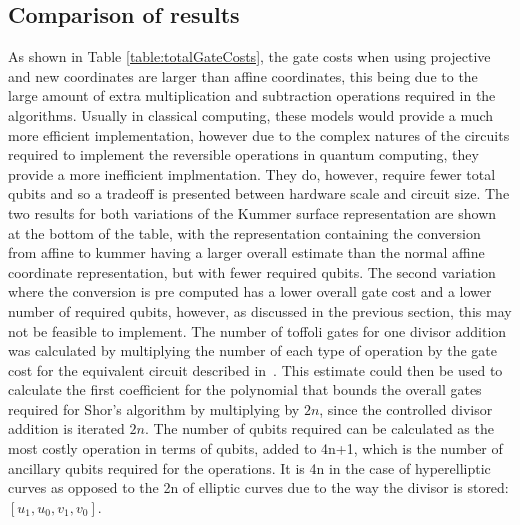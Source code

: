 \subsection{Comparison of results}
As shown in Table \ref{table:totalGateCosts}, the gate costs when using projective and new coordinates are larger than affine coordinates, this being due to the large amount of extra multiplication and subtraction operations required in the algorithms. Usually in classical computing, these models would provide a much more efficient implementation, however due to the complex natures of the circuits required to implement the reversible operations in quantum computing, they provide a more inefficient implmentation. They do, however, require fewer total qubits and so a tradeoff is presented between hardware scale and circuit size. The two results for both variations of the Kummer surface representation are shown at the bottom of the table, with the representation containing the conversion from affine to kummer having a larger overall estimate than the normal affine coordinate representation, but with fewer required qubits. The second variation where the conversion is pre computed has a lower overall gate cost and a lower number of required qubits, however, as discussed in the previous section, this may not be feasible to implement. The number of toffoli gates for one divisor addition was calculated by multiplying the number of each type of operation by the gate cost for the equivalent circuit described in~\cite{roetteler2017quantum}. This estimate could then be used to calculate the first coefficient for the polynomial that bounds the overall gates required for Shor's algorithm by multiplying by $2n$, since the controlled divisor addition is iterated $2n$. The number of qubits required can be calculated as the most costly operation in terms of qubits, added to 4n+1, which is the number of ancillary qubits required for the operations. It is 4n in the case of hyperelliptic curves as opposed to the 2n of elliptic curves due to the way the divisor is stored: $[u_{1},u_{0},v_{1},v_{0}]$.
